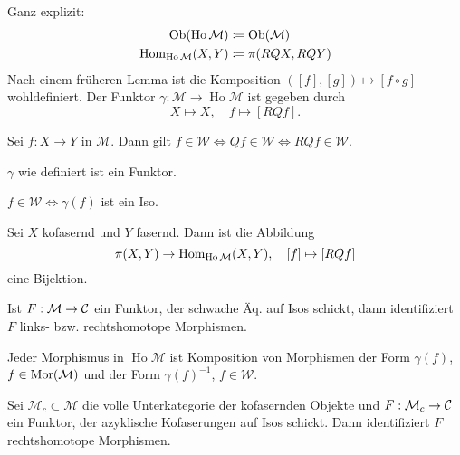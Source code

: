 \documentclass{cheat-sheet}
\newcommand{\Weak}{\mathcal{W}} %
\newcommand{\ModC}{\mathcal{M}} %
\DeclareMathOperator{\Ho}{Ho} %
\begin{document}
\begin{konstr}
  Ganz explizit:
  \begin{align*}
    \Ob(\Ho \ModC) & \coloneqq \Ob(\ModC) \\
    \Hom_{\Ho \ModC}(X, Y) & \coloneqq \pi(RQX, RQY)
  \end{align*}
  Nach einem früheren Lemma ist die Komposition $([f], [g]) \mapsto [f \circ g]$ wohldefiniert.
  Der Funktor $\gamma : \ModC \to \Ho \ModC$ ist gegeben durch
  \[
    X \mapsto X, \quad
    f \mapsto [RQf].
  \]
\end{konstr}

\begin{lem}
  Sei $f : X \to Y$ in $\ModC$. Dann gilt $f \!\in\! \Weak \Leftrightarrow Qf \!\in\! \Weak \Leftrightarrow RQf \!\in\! \Weak$.
\end{lem}

\begin{lem}
  $\gamma$ wie definiert ist ein Funktor.
\end{lem}


\begin{lem}
  $f \in \Weak \iff \gamma(f)$ ist ein Iso.
\end{lem}

\begin{bem}
  Sei $X$ kofasernd und $Y$ fasernd. Dann ist die Abbildung
  \[
    \pi(X, Y) \to \Hom_{\Ho \ModC}(X, Y), \quad
    [f] \mapsto [RQf]
  \]
  eine Bijektion.
\end{bem}

\begin{lem}
  Ist $F : \ModC \to \Cat$ ein Funktor, der schwache Äq. auf Isos schickt, dann identifiziert $F$ links- bzw. rechtshomotope Morphismen.
\end{lem}

\begin{lem}
  Jeder Morphismus in $\Ho \ModC$ ist Komposition von Morphismen der Form $\gamma(f)$, $f \in \Mor(\ModC)$ und der Form $\gamma(f)^{-1}$, $f \in \Weak$.
\end{lem}

\begin{lem}
  Sei $\ModC_c \subset \ModC$ die volle Unterkategorie der kofasernden Objekte und $F : \ModC_c \to \Cat$ ein Funktor, der azyklische Kofaserungen auf Isos schickt. Dann identifiziert $F$ rechtshomotope Morphismen.
\end{lem}
\end{document}

